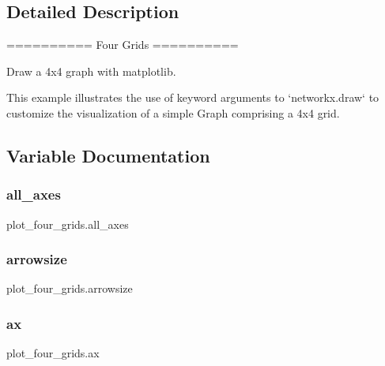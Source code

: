 \subsection{Detailed Description}
\begin{DoxyVerb}==========
Four Grids
==========

Draw a 4x4 graph with matplotlib.

This example illustrates the use of keyword arguments to `networkx.draw` to
customize the visualization of a simple Graph comprising a 4x4 grid.
\end{DoxyVerb}
 

\subsection{Variable Documentation}
\mbox{\label{namespaceplot__four__grids_a2645d3ec49a77fbb4f81153a42a7c372}} 
\subsubsection{\texorpdfstring{all\+\_\+axes}{all\_axes}}
{\footnotesize\ttfamily plot\+\_\+four\+\_\+grids.\+all\+\_\+axes}

\mbox{\label{namespaceplot__four__grids_a75cbfcd87df85430a59d4d08e4e17d7c}} 
\subsubsection{\texorpdfstring{arrowsize}{arrowsize}}
{\footnotesize\ttfamily plot\+\_\+four\+\_\+grids.\+arrowsize}

\mbox{\label{namespaceplot__four__grids_a04ba7d4f733ef4d4482b7130fad17146}} 
\subsubsection{\texorpdfstring{ax}{ax}}
{\footnotesize\ttfamily plot\+\_\+four\+\_\+grids.\+ax}

